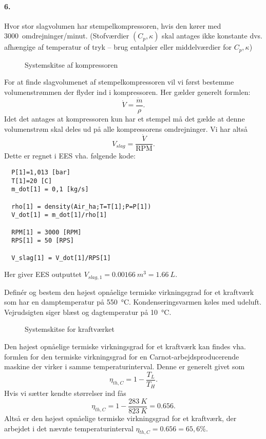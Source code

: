 \documentclass[a4paper]{article}
\begin{document}
\paragraph{6.} Hvor stor slagvolumen har stempelkompressoren, hvis den kører med \qty{3000}{omdrejninger/minut}. (Stofværdier $(C_p, \kappa)$ skal antages ikke konstante dvs. afhængige af temperatur of tryk -- brug entalpier eller middelværdier for $C_p, \kappa$)
\begin{figure}[ht]
    \centering
    \caption{Systemskitse af kompressoren}
\end{figure}
\bigbreak
For at finde slagvolumenet af stempelkompressoren vil vi først bestemme volumenstrømmen der flyder ind i kompressoren. Her gælder generelt formlen:
\[ 
\dot{V} = \frac{\dot{m}}{\rho}
.\]
Idet det antages at kompressoren kun har et stempel må det gælde at denne volumenstrøm skal deles ud på alle kompressorens omdrejninger. Vi har altså
\[ 
V_{slag} = \frac{\dot{V}}{\mathrm{RPM}}
.\]
Dette er regnet i EES vha. følgende kode:
\begin{verbatim}
  P[1]=1,013 [bar]
  T[1]=20 [C]
  m_dot[1] = 0,1 [kg/s]
   
  rho[1] = density(Air_ha;T=T[1];P=P[1])
  V_dot[1] = m_dot[1]/rho[1]
   
  RPM[1] = 3000 [RPM]
  RPS[1] = 50 [RPS]
   
  V_slag[1] = V_dot[1]/RPS[1]
\end{verbatim}
Her giver EES outputtet $V_{slag, 1} = \qty{0,00166}{m^3} = \qty{1,66}{L}$.

Definér og bestem den højest opnåelige termiske virkningsgrad for et kraftværk som har en damptemperatur på \qty{550}{\celsius}. Kondenseringsvarmen køles med udeluft. Vejrudsigten siger blæst og dagtemperatur på \qty{10}{\celsius}.
\begin{figure}[ht]
    \centering
    \caption{Systemskitse for kraftværket}
    \label{fig:a5_6}
\end{figure}
\bigbreak
Den højest opnåelige termiske virkningsgrad for et kraftværk kan findes vha. formlen for den termiske virkningsgrad for en Carnot-arbejdsproducerende maskine der virker i samme temperaturinterval. Denne er generelt givet som
\[ 
\eta_{th,C} = 1 - \frac{T_L}{T_H}
.\]
Hvis vi sætter kendte størrelser ind fås
\[ 
\eta_{th, C} = 1 - \frac{\qty{283}{K}}{\qty{823}{K}} = \num{0,656} 
.\]
Altså er den højest opnåelige termiske virkningsgrad for et kraftværk, der arbejdet i det nævnte temperaturinterval $\eta_{th,C} = \num{0,656} = 65,6\%$.
\end{document}
